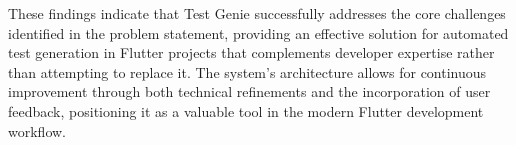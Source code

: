 These findings indicate that Test Genie successfully addresses the core challenges identified in the problem statement, providing an effective solution for automated test generation in Flutter projects that complements developer expertise rather than attempting to replace it. The system's architecture allows for continuous improvement through both technical refinements and the incorporation of user feedback, positioning it as a valuable tool in the modern Flutter development workflow.